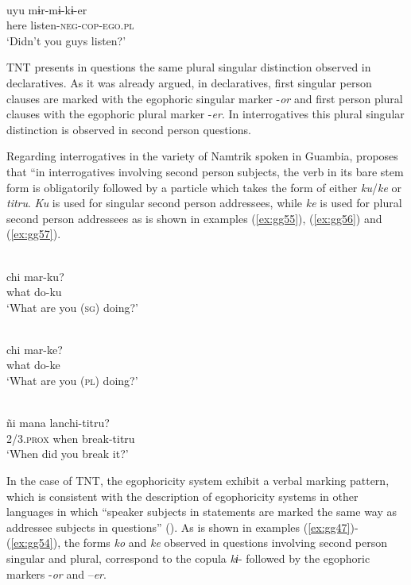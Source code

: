 \documentclass[output=paper]{langsci/langscibook}
\begin{document}
\ea \label{ex:gg54}
\\
	\gll uyu mɨr-mɨ-kɨ-er\\
	here listen-\textsc{neg-cop-ego.pl}\\
	\glt ‘Didn’t you guys listen?’
\z


TNT presents in questions the same plural singular distinction observed in declaratives. As it was already argued, in declaratives, first singular person clauses are marked with the egophoric singular marker -\textit{or} and first person plural clauses with the egophoric plural marker -\textit{er}. In interrogatives this plural singular distinction is observed in second person questions.

Regarding interrogatives in the variety of Namtrik spoken in Guambia, \citet{Norcliffe2018} proposes that “in interrogatives involving second person subjects, the verb in its bare stem form is obligatorily followed by a particle which takes the form of either \textit{ku}/\textit{ke} or \textit{titru}. \textit{Ku} is used for singular second person addressees, while \textit{ke} is used for plural second person addressees as is shown in examples (\ref{ex:gg55}), (\ref{ex:gg56}) and (\ref{ex:gg57}). 

\ea \label{ex:gg55}
\\
	\gll chi	mar-ku?\\
	what do-ku\\
	\glt ‘What are you (\textsc{sg}) doing?’
\z

\ea \label{ex:gg56}
\\
	\gll chi	mar-ke?\\
	what do-ke\\
	\glt ‘What are you (\textsc{pl}) doing?’
\z

\ea \label{ex:gg57}
\\
	\gll ñi	mana	lanchi-titru?\\
	2/3.\textsc{prox} when break-titru\\
	\glt ‘When did you break it?’
\z

In the case of TNT, the egophoricity system exhibit a verbal marking pattern, which is consistent with the description of egophoricity systems in other languages in which “speaker subjects in statements are marked the same way as addressee subjects in questions” (\citealt{Curnow2002a}). As is shown in examples (\ref{ex:gg47})-(\ref{ex:gg54}), the forms \textit{ko} and \textit{ke} observed in questions involving second person singular and plural, correspond to the copula \textit{kɨ}- followed by the egophoric markers -\textit{or} and –\textit{er}. 
\end{document}
